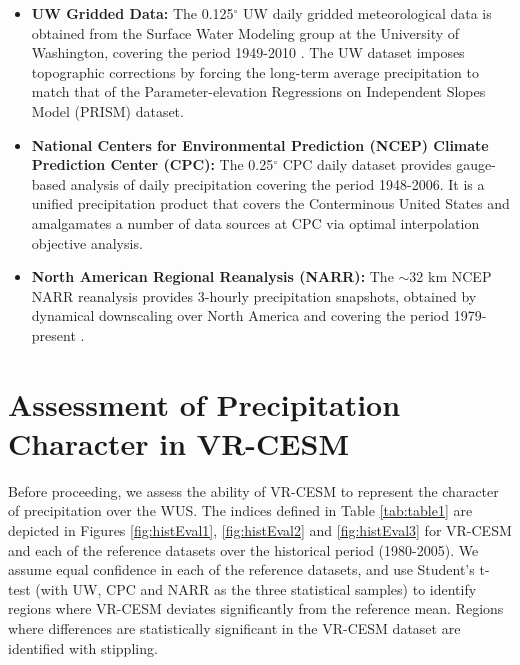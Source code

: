 \begin{itemize}
\item[] \textbf{UW Gridded Data:}  The 0.125$^\circ$ UW daily gridded meteorological data is obtained from the Surface Water Modeling group at the University of Washington, covering the period 1949-2010 \cite{maurer2002long, hamlet2005production}. The UW dataset imposes topographic corrections by forcing the long-term average precipitation to match that of the Parameter-elevation Regressions on Independent Slopes Model (PRISM) dataset.

\item[] \textbf{National Centers for Environmental Prediction (NCEP) Climate Prediction Center (CPC):}  The 0.25$^\circ$ CPC daily dataset provides gauge-based analysis of daily precipitation covering the period 1948-2006. It is a unified precipitation product that covers the Conterminous United States and amalgamates a number of data sources at CPC via optimal interpolation objective analysis.

\item[] \textbf{North American Regional Reanalysis (NARR):}  The $\sim$32 km NCEP NARR reanalysis provides 3-hourly precipitation snapshots, obtained by dynamical downscaling over North America and covering the period 1979-present \cite{mesinger2006north}.
\end{itemize}



\section{Assessment of Precipitation Character in VR-CESM} \label{sec:ModelAssessment}

Before proceeding, we assess the ability of VR-CESM to represent the character of precipitation over the WUS.  The indices defined in Table \ref{tab:table1} are depicted in Figures \ref{fig:histEval1}, \ref{fig:histEval2} and \ref{fig:histEval3} for VR-CESM and each of the reference datasets over the historical period (1980-2005).  We assume equal confidence in each of the reference datasets, and use Student's t-test (with UW, CPC and NARR as the three statistical samples) to identify regions where VR-CESM deviates significantly from the reference mean.  Regions where differences are statistically significant in the VR-CESM dataset are identified with stippling.


